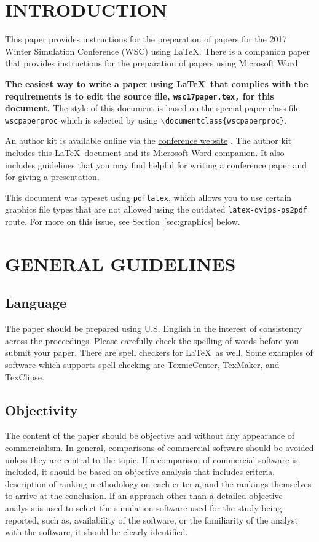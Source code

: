 \documentclass{wscpaperproc}
\theoremstyle{wsc}
\begin{document}
\section{INTRODUCTION}
\label{sec:intro}

This paper provides instructions for the preparation of papers for the 2017
Winter Simulation Conference (WSC) using \LaTeX. There is a companion paper that
provides instructions for the preparation of papers using Microsoft Word.

\textbf{The easiest way to write a paper using \LaTeX\ that complies with the
requirements is to edit the source file, {\tt wsc17paper.tex,} for this document.}
The style of this document is based on the special paper class file {\tt wscpaperproc} which is selected by using {\tt $\backslash$documentclass\{wscpaperproc\}}.

An author kit is available online via the  \href{http://www.wintersim.org}%
{conference website} \cite{WSC}.
The author kit includes this \LaTeX\ document and its Microsoft Word companion.
It also includes guidelines that you may find helpful for writing a conference paper and for giving a presentation.

This document was typeset using {\tt pdflatex}, which allows you to use certain
graphics file types that are not allowed using the outdated {\tt latex-dvips-ps2pdf} route.
For more on this issue, see Section~\ref{sec:graphics} below.

\section{GENERAL GUIDELINES}

\subsection{Language}

The paper should be prepared using U.S. English in the interest of consistency across the proceedings. Please carefully check the spelling of words before you submit your paper. There are spell checkers for \LaTeX\ as well.
Some examples of software which supports spell checking are TexnicCenter, TexMaker, and TexClipse.

\subsection{Objectivity}
The content of the paper should be objective and without any appearance of commercialism.  In general, comparisons of commercial software should be avoided unless they are central to the topic.  If a comparison of commercial software is included, it should be based on objective analysis that includes criteria, description of ranking methodology on each criteria, and the rankings themselves to arrive at the conclusion.
If an approach other than a detailed objective analysis is used to select the simulation software used for the study being reported, such as, availability of the software, or the familiarity of the analyst with the software, it should be clearly identified.
\end{document}
